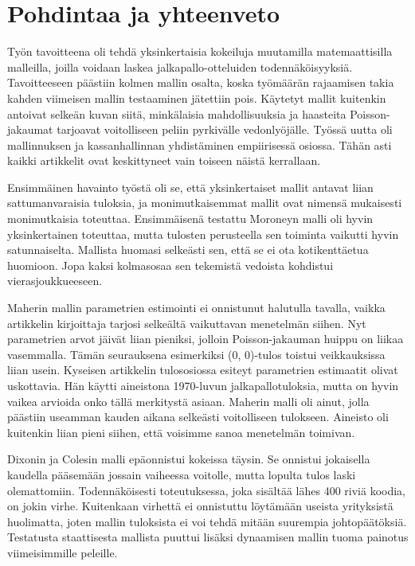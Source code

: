 \documentclass[a4paper,finnish,titlepage,12pt]{article}
\begin{document}
\section{Pohdintaa ja yhteenveto}
Työn tavoitteena oli tehdä yksinkertaisia kokeiluja muutamilla matemaattisilla malleilla, joilla voidaan laskea jalkapallo-otteluiden todennäköisyyksiä.
Tavoitteeseen päästiin kolmen mallin osalta, koska työmäärän rajaamisen takia kahden viimeisen mallin testaaminen jätettiin pois.
Käytetyt mallit kuitenkin antoivat selkeän kuvan siitä, minkälaisia mahdollisuuksia ja haasteita Poisson-jakaumat tarjoavat voitolliseen peliin pyrkivälle vedonlyöjälle.
Työssä uutta oli mallinnuksen ja kassanhallinnan yhdistäminen empiirisessä osiossa.
Tähän asti kaikki artikkelit ovat keskittyneet vain toiseen näistä kerrallaan.

Ensimmäinen havainto työstä oli se, että yksinkertaiset mallit antavat liian sattumanvaraisia tuloksia, ja monimutkaisemmat mallit ovat nimensä mukaisesti monimutkaisia toteuttaa.
Ensimmäisenä testattu Moroneyn malli oli hyvin yksinkertainen toteuttaa, mutta tulosten perusteella sen toiminta vaikutti hyvin satunnaiselta.
Mallista huomasi selkeästi sen, että se ei ota kotikenttäetua huomioon.
Jopa kaksi kolmasosaa sen tekemistä vedoista kohdistui vierasjoukkueeseen.

Maherin mallin parametrien estimointi ei onnistunut halutulla tavalla, vaikka artikkelin kirjoittaja tarjosi selkeältä vaikuttavan menetelmän siihen.
Nyt parametrien arvot jäivät liian pieniksi, jolloin Poisson-jakauman huippu on liikaa vasemmalla. 
Tämän seurauksena esimerkiksi (0, 0)-tulos toistui veikkauksissa liian usein.
Kyseisen artikkelin tulososiossa esiteyt parametrien estimaatit olivat uskottavia. Hän käytti aineistona 1970-luvun jalkapallotuloksia, mutta on hyvin vaikea arvioida onko tällä merkitystä asiaan.
Maherin malli oli ainut, jolla päästiin useamman kauden aikana selkeästi voitolliseen tulokseen.
Aineisto oli kuitenkin liian pieni siihen, että voisimme sanoa menetelmän toimivan.

Dixonin ja Colesin malli epäonnistui kokeissa täysin.
Se onnistui jokaisella kaudella pääsemään jossain vaiheessa voitolle, mutta lopulta tulos laski olemattomiin.
Todennäköisesti toteutuksessa, joka sisältää lähes 400 riviä koodia, on jokin virhe.
Kuitenkaan virhettä ei onnistuttu löytämään useista yrityksistä huolimatta, joten mallin tuloksista ei voi tehdä mitään suurempia johtopäätöksiä.
Testatusta staattisesta mallista puuttui lisäksi dynaamisen mallin tuoma painotus viimeisimmille peleille.
\end{document}
